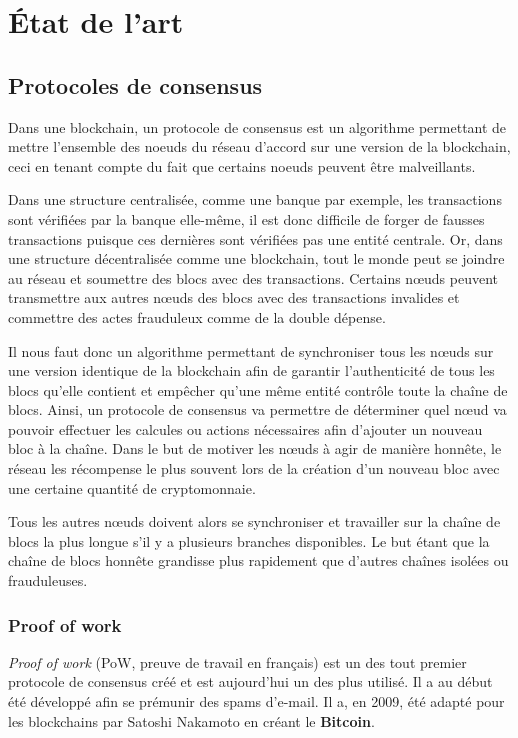 \chapter{État de l'art}
\label{ch:etat_art}

\section{Protocoles de consensus}

Dans une blockchain, un protocole de consensus est un algorithme permettant de mettre l'ensemble des noeuds du réseau d'accord sur une version de la blockchain, ceci en tenant compte du fait que certains noeuds peuvent être malveillants.

Dans une structure centralisée, comme une banque par exemple, les transactions sont vérifiées par la banque elle-même, il est donc difficile de forger de fausses transactions puisque ces dernières sont vérifiées pas une entité centrale. Or, dans une structure décentralisée comme une blockchain, tout le monde peut se joindre au réseau et soumettre des blocs avec des transactions. Certains nœuds peuvent transmettre aux autres nœuds des blocs avec des transactions invalides et commettre des actes frauduleux comme de la double dépense.

Il nous faut donc un algorithme permettant de synchroniser tous les nœuds sur une version identique de la blockchain afin de garantir l'authenticité de tous les blocs qu'elle contient et empêcher qu'une même entité contrôle toute la chaîne de blocs. Ainsi, un protocole de consensus va permettre de déterminer quel nœud va pouvoir effectuer les calcules ou actions nécessaires afin d'ajouter un nouveau bloc à la chaîne. Dans le but de motiver les nœuds à agir de manière honnête, le réseau les récompense le plus souvent lors de la création d'un nouveau bloc avec une certaine quantité de cryptomonnaie. 

Tous les autres nœuds doivent alors se synchroniser et travailler sur la chaîne de blocs la plus longue s'il y a plusieurs branches disponibles. Le but étant que la chaîne de blocs honnête grandisse plus rapidement que d'autres chaînes isolées ou frauduleuses.

\subsection{Proof of work}
\label{consensus:pow}

\textit{Proof of work} (PoW, preuve de travail en français) est un des tout premier protocole de consensus créé et est aujourd'hui un des plus utilisé. Il a au début été développé afin se prémunir des spams d'e-mail. Il a, en 2009, été adapté pour les blockchains par Satoshi Nakamoto en créant le \textbf{Bitcoin}.

